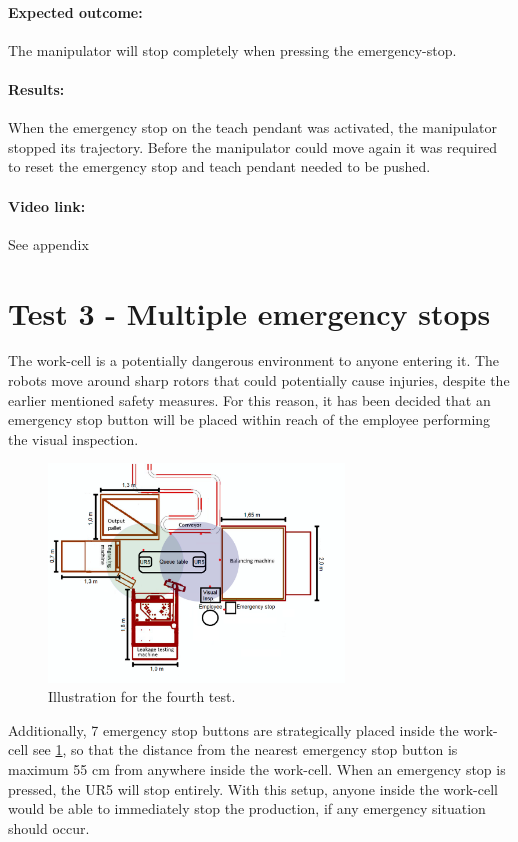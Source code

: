 \paragraph{Expected outcome:}
The manipulator will stop completely when pressing the emergency-stop.

\paragraph{Results: }
When the emergency stop on the teach pendant was activated, the manipulator stopped its trajectory. Before the manipulator could move again it was required to reset the emergency stop and teach pendant needed to be pushed.\\

\paragraph{Video link: }
See appendix \cite{testfilm}

\section{Test 3 - Multiple emergency stops}
The work-cell is a potentially dangerous environment to anyone entering it. The robots move around sharp rotors that could potentially cause injuries, despite the earlier mentioned safety measures. For this reason, it has been decided that an emergency stop button will be placed within reach of the employee performing the visual inspection.
\begin{figure}[H]
    \centering
    \includegraphics[width=0.7\textwidth]{Design/Work_cell_10.png}
    \caption{Illustration for the fourth test.}
    \label{fig:fourthtest}
\end{figure}
Additionally, 7 emergency stop buttons are strategically placed inside the work-cell see \ref{fig:fourthtest}, so that the distance from the nearest emergency stop button is maximum 55 cm from anywhere inside the work-cell. When an emergency stop is pressed, the UR5 will stop entirely. With this setup, anyone inside the work-cell would be able to immediately stop the production, if any emergency situation should occur. \\
